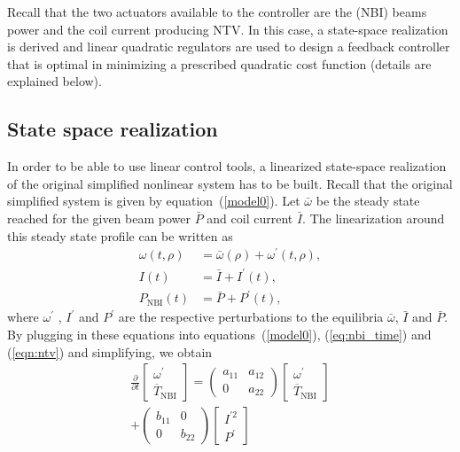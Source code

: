 \documentclass{iopart}
\begin{document}
 Recall that the two actuators available to the controller are the (NBI) beams power and the coil current producing NTV.
In this case, a state-space realization is derived and linear quadratic regulators are used to design a feedback controller that is optimal in minimizing a prescribed quadratic cost function (details are explained below).

\subsection{State space realization}
\label{SS}
In order to be able to use linear control tools, a linearized state-space realization of the original simplified nonlinear system has to be built.
Recall that the original simplified system is given by equation~(\ref{model0}).
Let $\bar{\omega}$ be the steady state reached for the given beam power $ \bar{P}$ and coil current $\bar{I}$. The linearization around this steady state profile can be written as
\begin{align}
\omega (t, \rho) &= \bar{\omega} (\rho) + \omega^{'}(t, \rho), \\
I (t) &= \bar{I} + I^{'}(t),\\
P_\text{NBI} (t) &= \bar{P} + P^{'}(t),
\end{align}
where $ \omega^{'}$ , $ I^{'}$ and $P^{'}$ are the respective perturbations to the equilibria $\bar{\omega}$, $\bar{I}$ and $\bar{P}$.
By plugging in these equations into equations~(\ref{model0}), (\ref{eq:nbi_time}) and (\ref{eqn:ntv}) and simplifying, we obtain
\begin{multline}
	\frac{\partial}{\partial t}   \left[\! \begin{array}{c}  \omega^{'} \\ \overline{T}_\text{NBI} \end{array}\!\right]
		={ \left(\! \begin{array}{cc} a_{11}  & a_{12} \\ 0 & a_{22} \end{array} \! \right)} \left[\! \begin{array}{c} \omega^{'} \\ \overline{T}_\text{NBI}    \end{array}  \!\right] \\
		+ \left(\! \begin{array}{cc} b_{11}  & 0 \\ 0 & b_{22}    \end{array}  \!\right) \left[\! \begin{array}{c}  I^{'2}  \\ P^{'}\end{array}\!\right]
	\label{SSR}
\end{multline}
\end{document}
